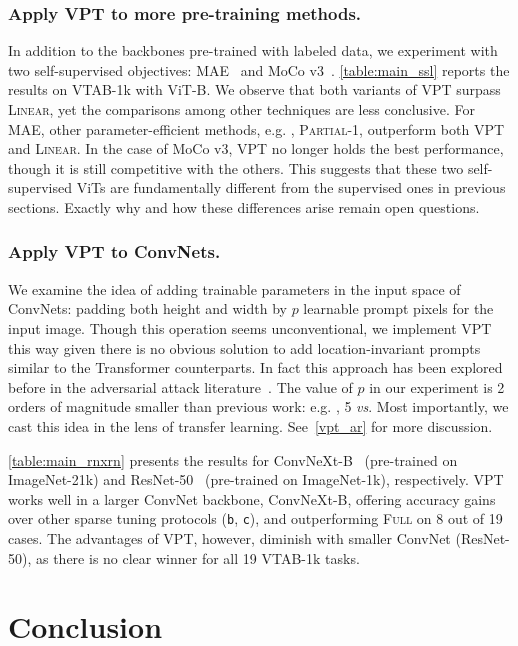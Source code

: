 \subsubsection{Apply VPT to more pre-training methods.} In addition to the backbones pre-trained with labeled data, we experiment with two self-supervised objectives: MAE~\cite{he2021mae} and MoCo v3~\cite{chen2021mocov3}.
\ref{table:main_ssl} reports the results on VTAB-1k with ViT-B. We observe that both variants of \textsc{VPT} surpass \textsc{Linear}, yet the comparisons among other techniques are less conclusive. For MAE, other parameter-efficient methods, e.g. , \textsc{Partial}-1, outperform both \textsc{VPT} and \textsc{Linear}.
In the case of MoCo v3, \textsc{VPT} no longer holds the best performance, though it is still competitive with the others. This suggests that these two self-supervised ViTs are fundamentally different from the supervised ones in previous sections. Exactly why and how these differences arise remain open questions.

\subsubsection{Apply VPT to ConvNets.} We examine the idea of adding trainable parameters in the input space of ConvNets: padding both height and width by $p$ learnable prompt pixels for the input image. Though this operation seems unconventional, we implement VPT this way given there is no obvious solution to add location-invariant prompts similar to the Transformer counterparts. In fact this approach has been explored before in the adversarial attack literature~\cite{elsayed2018adversarial}. The value of $p$ in our experiment is 2 orders of magnitude smaller than previous work: e.g. , 5 \emph{vs}. Most importantly, we cast this idea in the lens of transfer learning. See~\ref{vpt_ar} for more discussion.

\ref{table:main_rnxrn} presents the results for ConvNeXt-B~\cite{liu2022convnet} (pre-trained on ImageNet-21k) and ResNet-50~\cite{he2016rn} (pre-trained on ImageNet-1k), respectively.
\textsc{VPT} works well in a larger ConvNet backbone, ConvNeXt-B, offering accuracy gains over other sparse tuning protocols (\texttt{b}, \texttt{c}), and outperforming \textsc{Full} on 8 out of 19 cases. The advantages of \textsc{VPT}, however, diminish with smaller ConvNet (ResNet-50), as there is no clear winner for all 19 VTAB-1k tasks.

\section{Conclusion}

